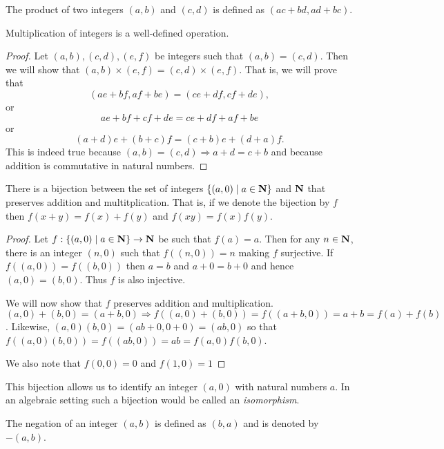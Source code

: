 \begin{defn}\label{c3s1d3}
The product of two integers $(a, b)$ and $(c, d)$ is defined as $(ac + bd,
ad + bc)$.
\end{defn}

\begin{lem}\label{c3s1l3}
Multiplication of integers is a well-defined operation.
\end{lem}
\begin{proof}
Let $(a, b), (c, d), (e, f)$ be integers such that $(a, b) = (c, d)$. Then
we will show that $(a, b) \times (e, f) = (c, d) \times (e, f)$. That is,
we will prove that
\[
(ae + bf, af + be) = (ce + df, cf + de),
\]
or
\[
ae + bf + cf + de = ce + df + af + be
\]
or
\[
(a + d)e + (b + c)f = (c + b)e + (d + a)f.
\]
This is indeed true because $(a, b) = (c, d) \Rightarrow a + d = c + b$ and
because addition is commutative in natural numbers.
\end{proof}

\begin{lem}\label{c3s1l4}
There is a bijection between the set of integers $\{(a, 0) \;|\; a \in 
\mathbf{N}\}$ and $\mathbf{N}$ that preserves addition and multitplication. That is, 
if we denote the bijection by $f$ then $f(x + y) = f(x) + f(y)$ and $f(xy)
= f(x)f(y)$.
\end{lem}
\begin{proof}
Let $f: \{(a, 0) \;|\; a \in \mathbf{N}\} \rightarrow \mathbf{N}$ be such that $f(a) =
a$. Then for any $n \in \mathbf{N}$, there is an integer $(n, 0)$ such that
$f((n, 0)) = n$ making $f$ surjective. If $f((a, 0)) = f((b, 0))$ then
$a = b$ and $a + 0 = b + 0$ and hence $(a, 0) = (b, 0)$. Thus $f$ is also
injective.

We will now show that $f$ preserves addition and multiplication. $(a, 0) +
(b, 0) = (a + b, 0) \Rightarrow f((a, 0) + (b, 0)) = f((a+b,0)) = a+b
= f(a) + f(b)$. Likewise, $(a, 0)(b, 0) = (ab+0,0+0)=(ab,0)$ so that
$f((a, 0)(b, 0)) = f((ab, 0)) = ab = f(a, 0)f(b, 0)$.

We also note that $f(0, 0) = 0$ and $f(1, 0) = 1$
\end{proof}

This bijection allows us to identify an integer $(a, 0)$ with natural 
numbers $a$. In an algebraic setting such a bijection would be called an
\emph{isomorphism}.

\begin{defn}\label{c3s1d4}
The negation of an integer $(a, b)$ is defined as $(b, a)$ and is denoted
by $-(a, b)$.
\end{defn}

